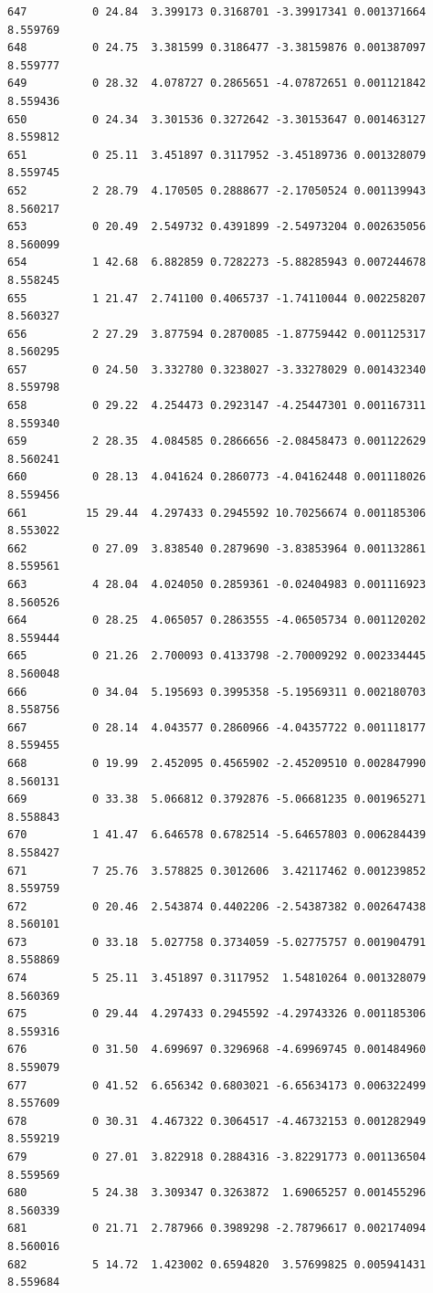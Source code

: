 \documentclass[]{book}
\theoremstyle{definition}
\theoremstyle{definition}
\theoremstyle{definition}
\theoremstyle{remark}
\begin{document}
\begin{verbatim}
647          0 24.84  3.399173 0.3168701 -3.39917341 0.001371664 8.559769
648          0 24.75  3.381599 0.3186477 -3.38159876 0.001387097 8.559777
649          0 28.32  4.078727 0.2865651 -4.07872651 0.001121842 8.559436
650          0 24.34  3.301536 0.3272642 -3.30153647 0.001463127 8.559812
651          0 25.11  3.451897 0.3117952 -3.45189736 0.001328079 8.559745
652          2 28.79  4.170505 0.2888677 -2.17050524 0.001139943 8.560217
653          0 20.49  2.549732 0.4391899 -2.54973204 0.002635056 8.560099
654          1 42.68  6.882859 0.7282273 -5.88285943 0.007244678 8.558245
655          1 21.47  2.741100 0.4065737 -1.74110044 0.002258207 8.560327
656          2 27.29  3.877594 0.2870085 -1.87759442 0.001125317 8.560295
657          0 24.50  3.332780 0.3238027 -3.33278029 0.001432340 8.559798
658          0 29.22  4.254473 0.2923147 -4.25447301 0.001167311 8.559340
659          2 28.35  4.084585 0.2866656 -2.08458473 0.001122629 8.560241
660          0 28.13  4.041624 0.2860773 -4.04162448 0.001118026 8.559456
661         15 29.44  4.297433 0.2945592 10.70256674 0.001185306 8.553022
662          0 27.09  3.838540 0.2879690 -3.83853964 0.001132861 8.559561
663          4 28.04  4.024050 0.2859361 -0.02404983 0.001116923 8.560526
664          0 28.25  4.065057 0.2863555 -4.06505734 0.001120202 8.559444
665          0 21.26  2.700093 0.4133798 -2.70009292 0.002334445 8.560048
666          0 34.04  5.195693 0.3995358 -5.19569311 0.002180703 8.558756
667          0 28.14  4.043577 0.2860966 -4.04357722 0.001118177 8.559455
668          0 19.99  2.452095 0.4565902 -2.45209510 0.002847990 8.560131
669          0 33.38  5.066812 0.3792876 -5.06681235 0.001965271 8.558843
670          1 41.47  6.646578 0.6782514 -5.64657803 0.006284439 8.558427
671          7 25.76  3.578825 0.3012606  3.42117462 0.001239852 8.559759
672          0 20.46  2.543874 0.4402206 -2.54387382 0.002647438 8.560101
673          0 33.18  5.027758 0.3734059 -5.02775757 0.001904791 8.558869
674          5 25.11  3.451897 0.3117952  1.54810264 0.001328079 8.560369
675          0 29.44  4.297433 0.2945592 -4.29743326 0.001185306 8.559316
676          0 31.50  4.699697 0.3296968 -4.69969745 0.001484960 8.559079
677          0 41.52  6.656342 0.6803021 -6.65634173 0.006322499 8.557609
678          0 30.31  4.467322 0.3064517 -4.46732153 0.001282949 8.559219
679          0 27.01  3.822918 0.2884316 -3.82291773 0.001136504 8.559569
680          5 24.38  3.309347 0.3263872  1.69065257 0.001455296 8.560339
681          0 21.71  2.787966 0.3989298 -2.78796617 0.002174094 8.560016
682          5 14.72  1.423002 0.6594820  3.57699825 0.005941431 8.559684

\end{verbatim}
\end{document}

